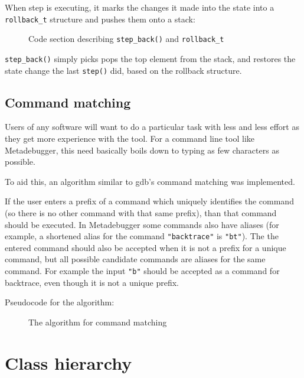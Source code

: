 When step is executing, it marks the changes it made into the state into a
\texttt{rollback\_t} structure and pushes them onto a stack:

\begin{figure}[H]
    \caption{Code section describing \texttt{step\_back()} and
        \texttt{rollback\_t}
    }
\end{figure}

\noindent
\texttt{step\_back()} simply picks pops the top element from the stack, and
restores the state change the last \texttt{step()} did, based on the
rollback structure.


\subsection{Command matching}

Users of any software will want to do a particular task with less and less
effort as they get more experience with the tool. For a command line tool like
Metadebugger, this need basically boils down to typing as few characters as
possible.

To aid this, an algorithm similar to gdb's command matching was implemented.

If the user enters a prefix of a command which uniquely identifies the command
(so there is no other command with that same prefix), than that command should
be executed. In Metadebugger some commands also have aliases (for example, a
shortened alias for the command \texttt{"backtrace"} is \texttt{"bt"}). The
the entered command should also be accepted when it is not a prefix for a
unique command, but all possible candidate commands are aliases for the same
command. For example the input \texttt{"b"} should be accepted as a command
for backtrace, even though it is not a unique prefix.

Pseudocode for the algorithm:

\begin{figure}[H]
    \caption{The algorithm for command matching}
\end{figure}

\pagebreak

\section{Class hierarchy}

